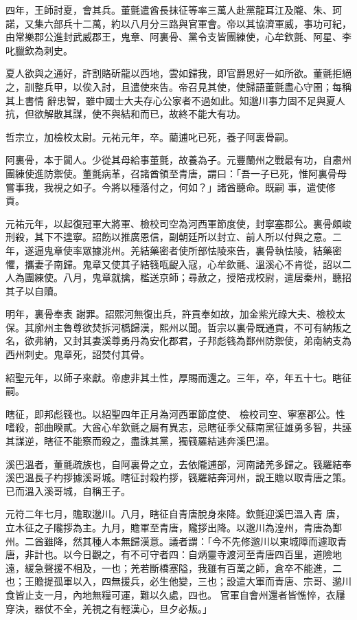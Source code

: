 \begin{pinyinscope}
 四年，王師討夏，會其兵。董氈遣酋長抹征等率三萬人赴黨龍耳江及隴、朱、珂諾，又集六部兵十二萬，約以八月分三路與官軍會。帝以其協濟軍威，事功可紀，由常樂郡公進封武威郡王，鬼章、阿裏骨、黨令支皆團練使，心牟欽氈、阿星、李叱臘欽為刺史。



 夏人欲與之通好，許割賂斫龍以西地，雲如歸我，即官爵恩好一如所欲。董氈拒絕之，訓整兵甲，以俟入討，且遣使來告。帝召見其使，使歸語董氈盡心守圉；每稱其上書情
 辭忠智，雖中國士大夫存心公家者不過如此。知邈川事力固不足與夏人抗，但欲解散其謀，使不與結和而已，故終不能大有功。



 哲宗立，加檢校太尉。元祐元年，卒。藺逋叱已死，養子阿裏骨嗣。



 阿裏骨，本于闐人。少從其母給事董氈，故養為子。元豐蘭州之戰最有功，自肅州團練使進防禦使。董氈病革，召諸酋領至青唐，謂曰：「吾一子已死，惟阿裏骨母嘗事我，我視之如子。今將以種落付之，何如？」諸酋聽命。既嗣
 事，遣使修貢。



 元祐元年，以起復冠軍大將軍、檢校司空為河西軍節度使，封寧塞郡公。裏骨頗峻刑殺，其下不遑寧。詔飭以推廣恩信，副朝廷所以封立、前人所以付與之意。二年，遂逼鬼章使率眾據洮州。羌結藥密者使所部怯陵來告，裏骨執怯陵，結藥密懼，攜妻子南歸。鬼章又使其子結篯咓齪入寇，心牟欽氈、溫溪心不肯從，詔以二人為團練使。八月，鬼章就擒，檻送京師；尋赦之，授陪戎校尉，遣居秦州，聽招其子以自贖。



 明年，裏骨奉表
 謝罪。詔熙河無復出兵，許貢奉如故，加金紫光祿大夫、檢校太保。其廓州主魯尊欲焚拆河橋歸漢，熙州以聞。哲宗以裏骨既通貢，不可有納叛之名，欲弗納，又封其妻溪尊勇丹為安化郡君，子邦彪篯為鄯州防禦使，弟南納支為西州刺史。鬼章死，詔焚付其骨。



 紹聖元年，以師子來獻。帝慮非其土性，厚賜而還之。三年，卒，年五十七。瞎征嗣。



 瞎征，即邦彪篯也。以紹聖四年正月為河西軍節度使、
 檢校司空、寧塞郡公。性嗜殺，部曲睽貳。大酋心牟欽氈之屬有異志，忌瞎征季父蘇南黨征雄勇多智，共誣其謀逆，瞎征不能察而殺之，盡誅其黨，獨篯羅結逃奔溪巴溫。



 溪巴溫者，董氈疏族也，自阿裏骨之立，去依隴逋部，河南諸羌多歸之。篯羅結奉溪巴溫長子杓拶據溪哥城。瞎征討殺杓拶，篯羅結奔河州，說王贍以取青唐之策。已而溫入溪哥城，自稱王子。



 元符二年七月，贍取邈川。八月，瞎征自青唐脫身來降。欽氈迎溪巴溫入青
 唐，立木征之子隴拶為主。九月，贍軍至青唐，隴拶出降。以邈川為湟州，青唐為鄯州。二酋雖降，然其種人本無歸漢意。議者謂：「今不先修邈川以東城障而遽取青唐，非計也。以今日觀之，有不可守者四：自炳靈寺渡河至青唐四百里，道險地遠，緩急聲援不相及，一也；羌若斷橋塞隘，我雖有百萬之師，倉卒不能進，二也；王贍提孤軍以入，四無援兵，必生他變，三也；設遣大軍而青唐、宗哥、邈川食皆止支一月，內地無糧可運，難以久處，四也。
 官軍自會州還者皆憔悴，衣屨穿決，器仗不全，羌視之有輕漢心，旦夕必叛。」




\end{pinyinscope}
